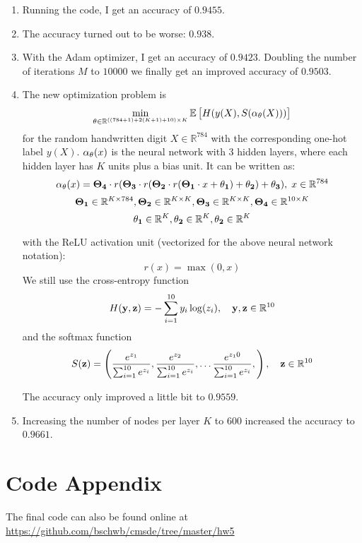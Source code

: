 \documentclass[a4paper,11pt]{scrartcl}
\newcommand*{\R}{\mathbb{R}}
\newcommand*{\EV}[1]{\mathbb{E}\left[{#1}\right]}
\newcommand*{\bt}{\bold{\theta}}
\begin{document}
\begin{enumerate}

\item
  Running the code, I get an accuracy of $0.9455$.

\item
  The accuracy turned out to be worse: $0.938$.

\item
  With the Adam optimizer, I get an accuracy of $0.9423$.
  Doubling the number of iterations $M$ to $10000$ we finally get an improved
  accuracy of $0.9503$.

\item
  The new optimization problem is
  \[ \min_{\bt \in \R^{((784 + 1) + 2 (K+1) + 10) \times K}} \EV{H(y(X), S(\alpha_\bt(X)))}\]
  for the random handwritten digit $X \in \R^{784}$ with the corresponding
  one-hot label $y(X)$.
  $\alpha_\bt(x)$ is the neural network with 3 hidden layers,
  where each hidden layer has $K$ units plus a bias unit.
  It can be written as:
  \[ \alpha_\bt(x) = \bold{\Theta_4} \cdot r(\bold{\Theta_3} \cdot
    r(\bold{\Theta_2} \cdot r(\bold{\Theta_1} \cdot x + \bold{\theta_1}) + \bold{\theta_2})
    + \bold{\theta_3}), \; x \in \R^{784} \]
  \[ \bold{\Theta_1} \in \R^{K \times 784}, \bold{\Theta_2} \in \R^{K \times
      K}, \bold{\Theta_3} \in \R^{K \times K}, \bold{\Theta_4} \in \R^{10 \times
    K}\]
\[ \bold{\theta_1} \in \R^K, \bold{\theta_2} \in \R^K, \bold{\theta_2} \in \R^K\]

  with the ReLU activation unit (vectorized for the above neural network notation):
  \[ r(x) = \max(0, x)\]
  We still use the cross-entropy function
  \[H(\bold{y}, \bold{z}) = -\sum^{10}_{i=1}y_i \log(z_i), \quad \bold{y}, \bold{z}
    \in \R^{10} \]
  and the softmax function
  \[ S(\bold{z}) = \left(
      \frac{e^{z_1}}{\sum^{10}_{i=1} e^{z_i}},
      \frac{e^{z_2}}{\sum^{10}_{i=1} e^{z_i}},
      \dots
      \frac{e^{z_10}}{\sum^{10}_{i=1} e^{z_i}},
    \right), \quad \bold{z} \in \R^{10}\]

  The accuracy only improved a little bit to $0.9559$.


\item
Increasing the number of nodes per layer $K$ to $600$ increased the accuracy to $0.9661$.

\end{enumerate}

\section*{Code Appendix}

The final code can also be found online at\\
\url{https://github.com/bschwb/cmsde/tree/master/hw5}


\end{document}
